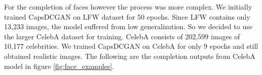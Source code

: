\newpage
For the completion of faces however the process was more complex. We initially trained CapsDCGAN on LFW dataset \cite{lfw} for 50 epochs. Since LFW contains only 13,233 images, the model suffered from low generalization. So we decided to use the larger CelebA dataset \cite{celeba} for training. CelebA consists of 202,599 images of 10,177 celebrities. We trained CapsDCGAN on CelebA for only 9 epochs and still obtained realistic images. The following are the completion outputs from CelebA model in figure \ref{fig:face_examples}.
\begin{figure}[H]
    \centering
    \\
    \centering
    \\
    \centering

\end{figure}

